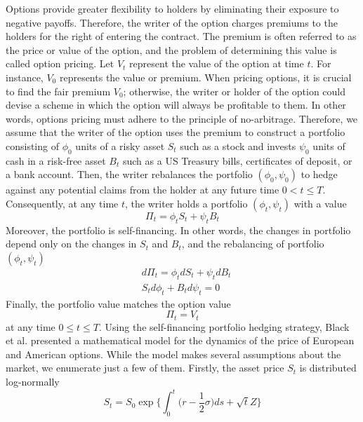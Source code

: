 Options provide greater flexibility to holders by eliminating their exposure to negative payoffs. Therefore, the writer of the option charges premiums to the holders for the right of entering the contract. The premium is often referred to as the price or value of the option, and the problem of determining this value is called option pricing. Let $V_t$ represent the value of the option at time $t$. For instance, $V_0$ represents the value or premium. When pricing options, it is crucial to find the fair premium $V_0$; otherwise, the writer or holder of the option could devise a scheme in which the option will always be profitable to them. In other words, options pricing must adhere to the principle of no-arbitrage. Therefore, we assume that the writer of the option uses the premium to construct a portfolio consisting of $\phi_0$ units of a risky asset $S_t$ such as a stock and invests $\psi_0$ units of cash in a risk-free asset $B_t$ such as a US Treasury bills, certificates of deposit, or a bank account. Then, the writer rebalances the portfolio $(\phi_0, \psi_0)$ to hedge against any potential claims from the holder at any future time $0 < t \le T$. Consequently, at any time $t$, the writer holds a portfolio $(\phi_t, \psi_t)$ with a value
\begin{equation*}
  \Pi_t = \phi_t S_t + \psi_t B_t
\end{equation*}
Moreover, the portfolio is self-financing. In other words, the changes in
portfolio depend only on the changes in $S_t$ and $B_t$,
and the rebalancing of portfolio $(\phi_t, \psi_t)$
\begin{align*}
   & d\Pi_t = \phi_tdS_t + \psi_t dB_t \\
   & S_t d\phi_t + B_t d\psi_t = 0
\end{align*}
Finally, the portfolio value matches the option value
\begin{equation*}
  \Pi_t = V_t
\end{equation*}
at any time $0 \le t \le T$. Using the self-financing portfolio hedging strategy, Black et al.\cite{black_scholes_1973} presented a mathematical model for the dynamics of the price of European and American options. While the model makes several assumptions about the market\cite{merton_1973}, we enumerate just a few of them. Firstly, the asset price $S_t$ is distributed log-normally
\begin{equation}
  \label{eq:blackscholes:preliminaries:asset_price}
  S_t = S_0 \exp\bigg\{\int_{0}^{t} \big(r - \dfrac{1}{2}\sigma\big)ds + \sqrt{t}Z\bigg\}
\end{equation}
